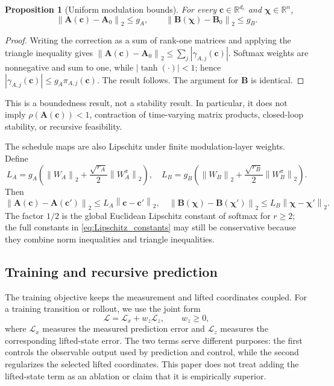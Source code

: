 ﻿\documentclass[journal]{IEEEtran}
\newtheorem{proposition}{Proposition}
\newcommand{\vc}{\mathbf{c}}
\newcommand{\vchi}{\boldsymbol{\chi}}
\newcommand{\mA}{\mathbf{A}}
\newcommand{\mB}{\mathbf{B}}
\newcommand{\R}{\mathbb{R}}
\newcommand{\norm}[1]{\left\lVert #1\right\rVert}
\begin{document}
\begin{proposition}[Uniform modulation bounds]
\label{prop:modulation_bound}
For every $\vc\in\R^{d_c}$ and $\vchi\in\R^n$,
\begin{equation}
    \norm{\mA(\vc)-\mA_0}_2\le g_A,
    \qquad
    \norm{\mB(\vchi)-\mB_0}_2\le g_B.
    \label{eq:modulation_bound}
\end{equation}
\end{proposition}
\begin{proof}
Writing the correction as a sum of rank-one matrices and applying the triangle inequality gives
$\norm{\mA(\vc)-\mA_0}_2\le\sum_j|\gamma_{A,j}(\vc)|$. Softmax weights are nonnegative and sum to one, while $|\tanh(\cdot)|<1$; hence $|\gamma_{A,j}(\vc)|\le g_A\pi_{A,j}(\vc)$. The result follows. The argument for $\mB$ is identical.
\end{proof}

This is a boundedness result, not a stability result. In particular, it does not imply $\rho(\mA(\vc))<1$, contraction of time-varying matrix products, closed-loop stability, or recursive feasibility.

The schedule maps are also Lipschitz under finite modulation-layer weights. Define
\begin{equation}
    L_A=g_A\left(\norm{W_A}_2+\frac{\sqrt{r_A}}{2}\norm{W_A^\pi}_2\right),
    \quad
    L_B=g_B\left(\norm{W_B}_2+\frac{\sqrt{r_B}}{2}\norm{W_B^\pi}_2\right).
    \label{eq:Lipschitz_constants}
\end{equation}
Then
\begin{equation}
    \norm{\mA(\vc)-\mA(\vc')}_2\le L_A\norm{\vc-\vc'}_2,
    \quad
    \norm{\mB(\vchi)-\mB(\vchi')}_2\le L_B\norm{\vchi-\vchi'}_2.
    \label{eq:schedule_lipschitz}
\end{equation}
The factor $1/2$ is the global Euclidean Lipschitz constant of softmax for $r\ge2$; the full constants in \eqref{eq:Lipschitz_constants} may still be conservative because they combine norm inequalities and triangle inequalities.

\subsection{Training and recursive prediction}

The training objective keeps the measurement and lifted coordinates coupled. For a training transition or rollout, we use the joint form
\begin{equation}
    \mathcal L=\mathcal L_x+w_z\mathcal L_z,
    \qquad w_z\ge0,
    \label{eq:joint_training_loss}
\end{equation}
where $\mathcal L_x$ measures the measured prediction error and $\mathcal L_z$ measures the corresponding lifted-state error. The two terms serve different purposes: the first controls the observable output used by prediction and control, while the second regularizes the selected lifted coordinates. This paper does not treat adding the lifted-state term as an ablation or claim that it is empirically superior.
\end{document}
